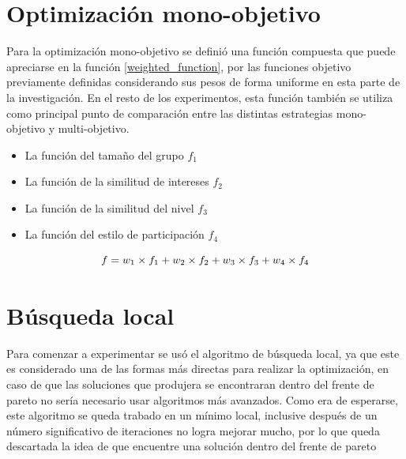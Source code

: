 \section{Optimización mono-objetivo}

Para la optimización mono-objetivo se definió una función compuesta que puede apreciarse en la función \ref{weighted_function}, por las funciones objetivo previamente definidas considerando sus pesos de forma uniforme en esta parte de la investigación. En el resto de los experimentos, esta función también se utiliza como principal punto de comparación entre las distintas estrategias mono-objetivo y multi-objetivo.
\begin{itemize}
\item La función del tamaño del grupo \(f_{1}\)
\item La función de la similitud de intereses \(f_{2}\)
\item La función de la similitud del nivel \(f_{3}\)
\item La función del estilo de participación \(f_{4}\)
\end{itemize}

\begin{equation} \label{weighted_function}
    f = w_{1} \times f_{1} + \\
    w_{2} \times f_{2} + \\
    w_{3} \times f_{3} + \\
    w_{4} \times f_{4}
\end{equation}

\section{Búsqueda local}

Para comenzar a experimentar se usó el algoritmo de búsqueda local, ya que este es considerado una de las formas más directas para realizar la optimización, en caso de que las soluciones que produjera se encontraran dentro del frente de pareto no sería necesario usar algoritmos más avanzados. Como era de esperarse, este algoritmo se queda trabado en un mínimo local, inclusive después de un número significativo de iteraciones no logra mejorar mucho, por lo que queda descartada la idea de que encuentre una solución dentro del frente de pareto

